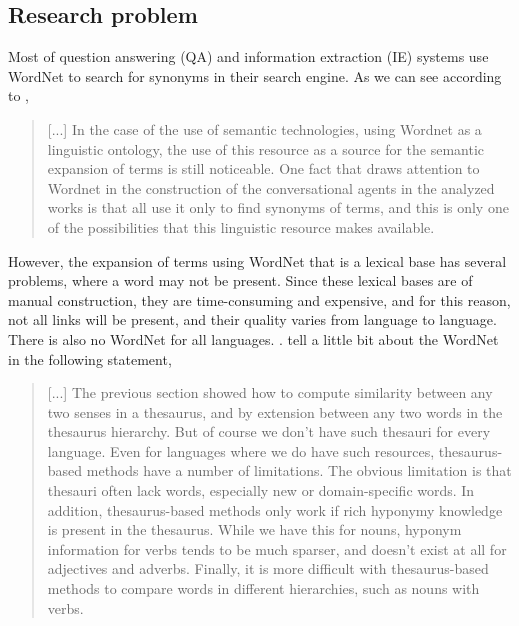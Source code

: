 \subsection{Research problem} 

Most of question answering (QA) and information extraction (IE) systems use WordNet to search for synonyms in their search engine. As we can see according to , 
\begin{quote}
    [...] In the case of the use of semantic technologies, using Wordnet as a linguistic ontology, the use of this resource as a source for the semantic expansion of terms is still noticeable. One fact that draws attention to Wordnet in the construction of the conversational agents in the analyzed works is that all use it only to find synonyms of terms, and this is only one of the possibilities that this linguistic resource makes available.
\end{quote}

However, the expansion of terms using WordNet that is a lexical base has several problems, where a word may not be present. Since these lexical bases are of manual construction, they are time-consuming and expensive, and for this reason, not all links will be present, and their quality varies from language to language. There is also no WordNet for all languages. \cite{Leeuwenberga2016}.  tell a little bit about the WordNet in the following statement,
\begin{quote}
    [...]
    The previous section showed how to compute similarity between any two senses in a thesaurus, and by extension between any two words in the thesaurus hierarchy. But of course we don't have such thesauri for every language. Even for languages where we do have such resources, thesaurus-based methods have a number of limitations. The obvious limitation is that thesauri often lack words, especially new or domain-specific words. In addition, thesaurus-based methods only work if rich hyponymy knowledge is present in the thesaurus. While we have this for nouns, hyponym information for verbs tends to be much sparser, and doesn't exist at all for adjectives and adverbs. Finally, it is more difficult with thesaurus-based methods to compare words in different hierarchies, such as nouns with verbs.
\end{quote}

